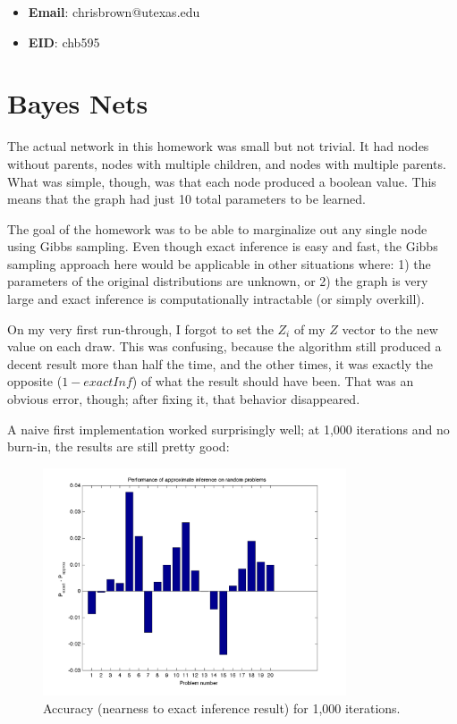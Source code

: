 \documentclass[11pt]{report}
\begin{document}
\begin{itemize}
  \item \textbf{Email}: chrisbrown@utexas.edu
  \item \textbf{EID}: chb595
\end{itemize}

\section{Bayes Nets}

The actual network in this homework was small but not trivial. It had nodes without parents, nodes with multiple children, and nodes with multiple parents. What was simple, though, was that each node produced a boolean value. This means that the graph had just 10 total parameters to be learned.

The goal of the homework was to be able to marginalize out any single node using Gibbs sampling. Even though exact inference is easy and fast, the Gibbs sampling approach here would be applicable in other situations where: 1) the parameters of the original distributions are unknown, or 2) the graph is very large and exact inference is computationally intractable (or simply overkill).

On my very first run-through, I forgot to set the $Z_i$ of my $Z$ vector to the new value on each draw. This was confusing, because the algorithm still produced a decent result more than half the time, and the other times, it was exactly the opposite ($1 - exactInf$) of what the result should have been. That was an obvious error, though; after fixing it, that behavior disappeared.

A naive first implementation worked surprisingly well; at 1,000 iterations and no burn-in, the results are still pretty good:

\begin{figure}[H]
  \centering
  \includegraphics[width=0.8\textwidth]{hw6-plot-n1000.png}
  \caption{Accuracy (nearness to exact inference result) for 1,000 iterations.}
  \label{fig:n1000}
\end{figure}
\end{document}
